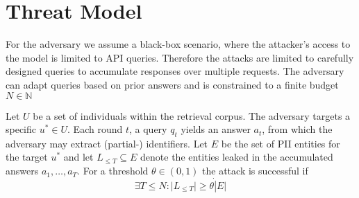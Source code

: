 \section{Threat Model}\label{background-sec:threat-model}
For the adversary we assume a black-box scenario, where the attacker's access to the model is limited to API queries. Therefore the attacks are limited to carefully designed queries to accumulate responses over multiple requests. The adversary can adapt queries based on prior answers and is constrained to a finite budget $N \in \mathbb{N}$

Let $U$ be a set of individuals within the retrieval corpus. The adversary targets a specific $u^* \in U$. Each round $t$, a query $q_t$ yields an answer $a_t$, from which the adversary may extract (partial-) identifiers. 
Let $E$ be the set of PII entities for the target $u^*$ and let $L_{\leq T}\subseteq E$ denote the entities leaked in the accumulated answers $a_1,\dots,a_T$. For a threshold $\theta\in(0,1)$ the attack is successful if
\[
    \exists T \leq N: \vert L_{\leq T}\vert \geq \theta \dot \vert E\vert 
\]


